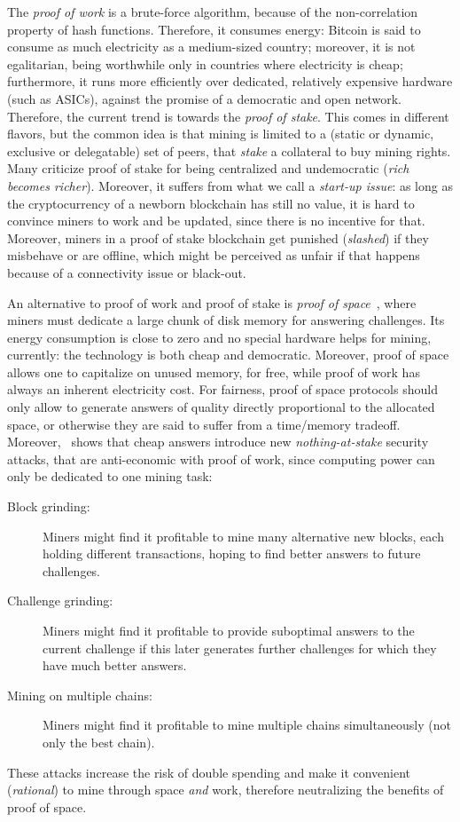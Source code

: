The \emph{proof of work} is a brute-force algorithm,
because of the non-correlation property of hash functions.
Therefore, it consumes energy: Bitcoin is said to consume as much electricity as
a medium-sized country; moreover, it is not egalitarian, being
worthwhile only in countries where electricity is cheap; furthermore, it
runs more efficiently over dedicated, relatively expensive hardware (such as ASICs),
against the promise of a democratic and open network.
Therefore, the current trend is towards the \emph{proof of stake}.
This comes in different flavors, but
the common idea is that mining is limited to a (static or dynamic, exclusive or delegatable)
set of peers, that \emph{stake} a collateral to buy mining rights.
Many criticize proof of stake for being centralized and undemocratic
(\emph{rich becomes richer}).
Moreover, it suffers from what we call a \emph{start-up issue}: as long as the cryptocurrency
of a newborn blockchain has still no value, it is hard to convince miners to work and
be updated, since there is no incentive for that. Moreover, miners in
a proof of stake blockchain get punished (\emph{slashed}) if they misbehave or are offline, which
might be perceived as unfair if that happens because of a connectivity issue or black-out.

An alternative to proof of work and proof of stake is
\emph{proof of space}~\cite{AtenieseBFG14,DziembowskiFKP15}, where
miners must dedicate a large chunk of disk memory for answering challenges.
Its energy consumption is close to zero and no special
hardware helps for mining, currently: the technology is both cheap
and democratic. Moreover, proof of space allows
one to capitalize on unused memory, for free, while proof of work has always an
inherent electricity cost.
For fairness, proof of space protocols should only allow to generate answers of
quality directly proportional to the allocated space, or otherwise they are said
to suffer from a time/memory tradeoff.
Moreover, \cite{ParkKFGAP18}~shows that
cheap answers introduce new \emph{nothing-at-stake} security attacks,
that are anti-economic with proof of work,
since computing power can only be dedicated to one mining task:
%
\begin{description}
\item[Block grinding:] Miners might find it profitable to mine many alternative new blocks, each holding
  different transactions, hoping to find better answers to future challenges.
\item[Challenge grinding:] Miners might find it profitable
  to provide suboptimal answers to the current challenge if
  this later generates further challenges for which they have much better answers.
\item[Mining on multiple chains:] Miners might find it profitable
  to mine multiple chains simultaneously (not only the best chain).
\end{description}
%
These attacks increase the risk of double spending and make it convenient
(\emph{rational}) to mine through space \emph{and} work, therefore neutralizing the benefits
of proof of space.

